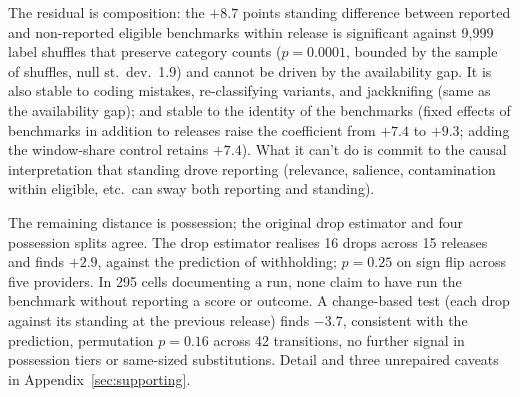 The residual is composition: the $+8.7$ points standing difference between reported and non-reported eligible benchmarks within release is significant against 9,999 label shuffles that preserve category counts ($p = 0.0001$, bounded by the sample of shuffles, null st.\ dev.\ 1.9) and cannot be driven by the availability gap. It is also stable to coding mistakes, re-classifying variants, and jackknifing (same as the availability gap); and stable to the identity of the benchmarks (fixed effects of benchmarks in addition to releases raise the coefficient from $+7.4$ to $+9.3$; adding the window-share control retains $+7.4$). What it can't do is commit to the causal interpretation that standing drove reporting (relevance, salience, contamination within eligible, etc.\ can sway both reporting and standing).

The remaining distance is possession; the original drop estimator and four possession splits agree. The drop estimator realises 16 drops across 15 releases and finds $+2.9$, against the prediction of withholding; $p = 0.25$ on sign flip across five providers. In 295 cells documenting a run, none claim to have run the benchmark without reporting a score or outcome. A change-based test (each drop against its standing at the previous release) finds $-3.7$, consistent with the prediction, permutation $p = 0.16$ across 42 transitions, no further signal in possession tiers or same-sized substitutions. Detail and three unrepaired caveats in Appendix~\ref{sec:supporting}.
